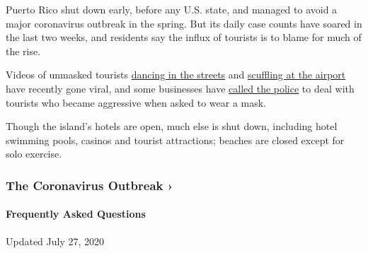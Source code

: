 Puerto Rico shut down early, before any U.S. state, and managed to avoid
a major coronavirus outbreak in the spring. But its daily case counts
have soared in the last two weeks, and residents say the influx of
tourists is to blame for much of the rise.

Videos of unmasked tourists
\href{https://www.telemundopr.com/noticias/puerto-rico/sin-mascarilla-y-distanciamiento-decenas-de-turistas-por-la-libre-en-condado/2105861/}{dancing
in the streets} and
\href{https://www.facebook.com/100000978562895/videos/4176373252405252/}{scuffling
at the airport} have recently gone viral, and some businesses have
\href{https://www.telemundopr.com/noticias/puerto-rico/sin-mascarilla-y-distanciamiento-decenas-de-turistas-por-la-libre-en-condado/2105861/}{called
the police} to deal with tourists who became aggressive when asked to
wear a mask.

Though the island's hotels are open, much else is shut down, including
hotel swimming pools, casinos and tourist attractions; beaches are
closed except for solo exercise.

\href{https://www.nytimes.com/news-event/coronavirus?action=click\&pgtype=Article\&state=default\&region=MAIN_CONTENT_3\&context=storylines_faq}{}

\hypertarget{the-coronavirus-outbreak-}{%
\subsubsection{The Coronavirus Outbreak
›}\label{the-coronavirus-outbreak-}}

\hypertarget{frequently-asked-questions}{%
\paragraph{Frequently Asked
Questions}\label{frequently-asked-questions}}

Updated July 27, 2020

